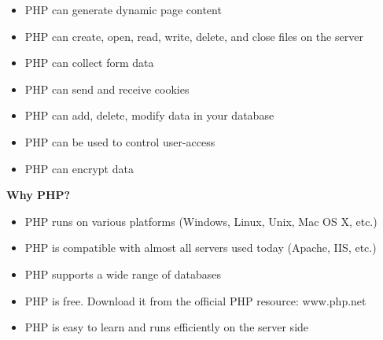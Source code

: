  \begin{itemize}
    \item PHP can generate dynamic page content
    \item PHP can create, open, read, write, delete, and close files on the server
     \item PHP can collect form data
     \item PHP can send and receive cookies
    \item  PHP can add, delete, modify data in your database
    \item PHP can be used to control user-access
     \item PHP can encrypt data\\
\end{itemize}
  {\bf Why PHP?}
 \begin{itemize}
 \item   PHP runs on various platforms (Windows, Linux, Unix, Mac OS X, etc.)
 \item   PHP is compatible with almost all servers used today (Apache, IIS, etc.)
\item    PHP supports a wide range of databases
 \item   PHP is free. Download it from the official PHP resource: www.php.net
 \item   PHP is easy to learn and runs efficiently on the server side
\end{itemize}

